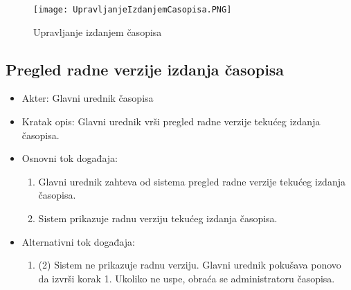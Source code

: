 \documentclass[a4paper]{article}
\begin{document}
\begin{figure}[hbt!]
    \centering
    \texttt{[image: UpravljanjeIzdanjemCasopisa.PNG]}
    \caption{Upravljanje izdanjem časopisa}
    \label{fig:my_label}
\end{figure}

\subsection{Pregled radne verzije izdanja časopisa}
\begin{itemize}
    \item Akter: Glavni urednik časopisa
    \item Kratak opis: Glavni urednik vrši pregled radne verzije tekućeg izdanja časopisa.
    \item Osnovni tok događaja:
        \begin{enumerate}
            \item Glavni urednik zahteva od sistema pregled radne verzije tekućeg izdanja časopisa.
            \item Sistem prikazuje radnu verziju tekućeg izdanja časopisa.
        \end{enumerate}
    \item Alternativni tok događaja:
        \begin{enumerate}
            \item  (2) Sistem ne prikazuje radnu verziju. Glavni urednik pokušava ponovo da izvrši korak 1. Ukoliko ne uspe, obraća se administratoru časopisa.
        \end{enumerate}
\end{itemize}
\end{document}
